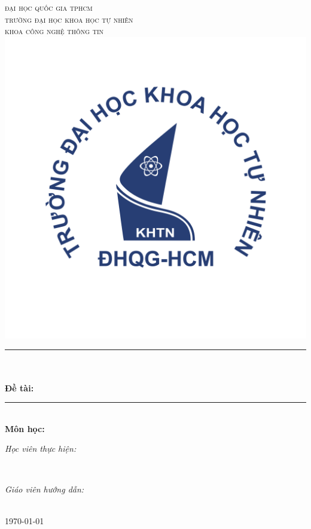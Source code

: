 \begin{titlepage}
\newcommand{\HRule}{\rule{\linewidth}{0.5mm}}
\centering

\textsc{\LARGE đại học quốc gia tphcm}\\[0.5cm]
\textsc{\Large trường đại học khoa học tự nhiên}\\[0.5cm]
\textsc{\large khoa công nghệ thông tin}\\[0.5cm]

\includegraphics[scale=.25]{img/hcmus-logo.png}%

\HRule \\[0.4cm]
{ 
\huge{\bfseries{\reporttitle}}\\[0.5cm]
\large{\bfseries{Đề tài: \reportname}}
}\\[0.5cm]
\HRule \\[0.5cm]

\textbf{\large Môn học: \coursename}\\[0.5cm]

\begin{minipage}[t]{0.5\textwidth}
\begin{flushleft} \large
\emph{Học viên thực hiện:}\\
\studentname
\end{flushleft}
\end{minipage}
~
\begin{minipage}[t]{0.4\textwidth}
\begin{flushright} \large
\emph{Giáo viên hướng dẫn:} \\
\teachername
\end{flushright}
\end{minipage}\\[1cm]

{\large \today}\\[.5cm]

\vfill
\end{titlepage}
	